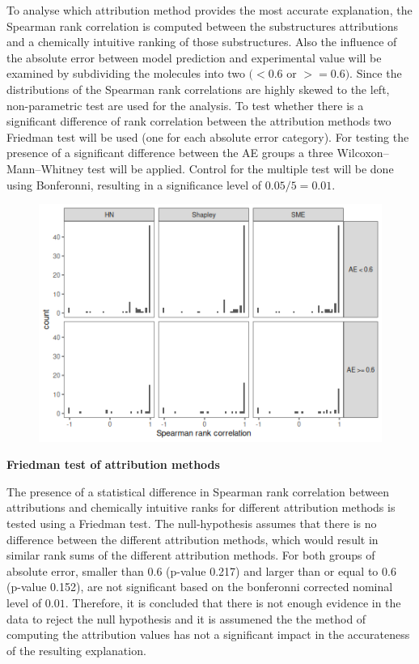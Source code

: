 To analyse which attribution method provides the most accurate
explanation, the Spearman rank correlation is computed between the
substructures attributions and a chemically intuitive ranking of those
substructures. Also the influence of the absolute error between model
prediction and experimental value will be examined by subdividing the
molecules into two \((<0.6\) or \(>=0.6)\). Since the distributions of
the Spearman rank correlations are highly skewed to the left,
non-parametric test are used for the analysis. To test whether there is
a significant difference of rank correlation between the attribution
methods two Friedman test will be used (one for each absolute error
category). For testing the presence of a significant difference between
the AE groups a three Wilcoxon--Mann--Whitney test will be applied.
Control for the multiple test will be done using Bonferonni, resulting
in a significance level of \(0.05/5 = 0.01\).


\begin{figure}[H]
    \includegraphics[scale=0.5]{./distributions-1.png}
\end{figure}


\textbf{Friedman test of attribution methods}
\label{friedman-test-of-attribution-methods}


The presence of a statistical difference in Spearman rank correlation
between attributions and chemically intuitive ranks for different
attribution methods is tested using a Friedman test. The null-hypothesis
assumes that there is no difference between the different attribution
methods, which would result in similar rank sums of the different
attribution methods. For both groups of absolute error, smaller than
\(0.6\) (p-value 0.217) and larger than or equal to \(0.6\) (p-value
0.152), are not significant based on the bonferonni corrected nominal
level of \(0.01\). Therefore, it is concluded that there is not enough
evidence in the data to reject the null hypothesis and it is assumened
the the method of computing the attribution values has not a significant
impact in the accurateness of the resulting explanation.




